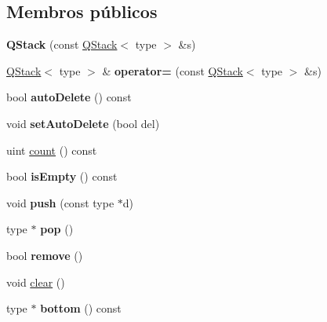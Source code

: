 \subsection*{Membros públicos}
\begin{DoxyCompactItemize}
\item 
\hypertarget{class_q_stack_af0f64db023d0cd48c2a72cfc34edba49}{{\bfseries Q\-Stack} (const \hyperlink{class_q_stack}{Q\-Stack}$<$ type $>$ \&s)}\label{class_q_stack_af0f64db023d0cd48c2a72cfc34edba49}

\item 
\hypertarget{class_q_stack_a47b67daee13dc2cc24824af003e8c9eb}{\hyperlink{class_q_stack}{Q\-Stack}$<$ type $>$ \& {\bfseries operator=} (const \hyperlink{class_q_stack}{Q\-Stack}$<$ type $>$ \&s)}\label{class_q_stack_a47b67daee13dc2cc24824af003e8c9eb}

\item 
\hypertarget{class_q_stack_a64c0f7f7f99c10922f570668b10acb2f}{bool {\bfseries auto\-Delete} () const }\label{class_q_stack_a64c0f7f7f99c10922f570668b10acb2f}

\item 
\hypertarget{class_q_stack_a670b4fe1fa9d29712524460f21ccdce0}{void {\bfseries set\-Auto\-Delete} (bool del)}\label{class_q_stack_a670b4fe1fa9d29712524460f21ccdce0}

\item 
uint \hyperlink{class_q_stack_a774149fc271ebaba2aabcd183a836e8f}{count} () const 
\item 
\hypertarget{class_q_stack_a479432127ee77145cc19d6a2d1590821}{bool {\bfseries is\-Empty} () const }\label{class_q_stack_a479432127ee77145cc19d6a2d1590821}

\item 
\hypertarget{class_q_stack_a0509dc2262fab7ecd1f24f2e816c2511}{void {\bfseries push} (const type $\ast$d)}\label{class_q_stack_a0509dc2262fab7ecd1f24f2e816c2511}

\item 
\hypertarget{class_q_stack_ad01a5163d0df646eeadfe185b602bc4e}{type $\ast$ {\bfseries pop} ()}\label{class_q_stack_ad01a5163d0df646eeadfe185b602bc4e}

\item 
\hypertarget{class_q_stack_a1f9c4a4bd47b7cd9beb431504c5ae46c}{bool {\bfseries remove} ()}\label{class_q_stack_a1f9c4a4bd47b7cd9beb431504c5ae46c}

\item 
void \hyperlink{class_q_stack_ac8bb3912a3ce86b15842e79d0b421204}{clear} ()
\item 
\hypertarget{class_q_stack_abd125715663cd989f5e6cf7a9bc5aeca}{type $\ast$ {\bfseries bottom} () const }\label{class_q_stack_abd125715663cd989f5e6cf7a9bc5aeca}


\end{DoxyCompactItemize}
